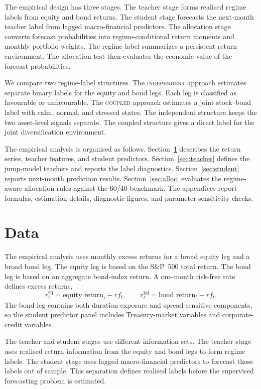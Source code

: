 \documentclass[10pt]{article}
\newcommand{\Acoup}{\textsc{coupled}}
\newcommand{\Bindep}{\textsc{independent}}
\begin{document}
The empirical design has three stages. The teacher stage forms realised regime labels from equity and bond returns. The student stage forecasts the next-month teacher label from lagged macro-financial predictors. The allocation stage converts forecast probabilities into regime-conditional return moments and monthly portfolio weights. The regime label summarizes a persistent return environment. The allocation test then evaluates the economic value of the forecast probabilities.

We compare two regime-label structures. The \Bindep{} approach estimates separate binary labels for the equity and bond legs. Each leg is classified as favourable or unfavourable. The \Acoup{} approach estimates a joint stock--bond label with calm, normal, and stressed states. The independent structure keeps the two asset-level signals separate. The coupled structure gives a direct label for the joint diversification environment.

The empirical analysis is organised as follows. Section~\ref{sec:data} describes the return series, teacher features, and student predictors. Section~\ref{sec:teacher} defines the jump-model teachers and reports the label diagnostics. Section~\ref{sec:student} reports next-month prediction results. Section~\ref{sec:alloc} evaluates the regime-aware allocation rules against the 60/40 benchmark. The appendices report formulas, estimation details, diagnostic figures, and parameter-sensitivity checks.

\section{Data}
\label{sec:data}
The empirical analysis uses monthly excess returns for a broad equity leg and a broad bond leg. The equity leg is based on the S\&P~500 total return. The bond leg is based on an aggregate bond-index return. A one-month risk-free rate defines excess returns,
\[
r^{\mathrm{eq}}_t=\text{equity return}_t-rf_t,\qquad
r^{\mathrm{bd}}_t=\text{bond return}_t-rf_t .
\]
The bond leg contains both duration exposure and spread-sensitive components, so the student predictor panel includes Treasury-market variables and corporate-credit variables.

The teacher and student stages use different information sets. The teacher stage uses realised return information from the equity and bond legs to form regime labels. The student stage uses lagged macro-financial predictors to forecast those labels out of sample. This separation defines realised labels before the supervised forecasting problem is estimated.
\end{document}
